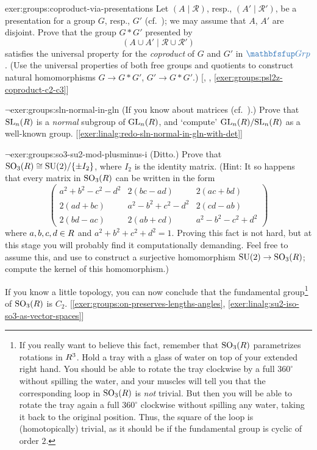 \begin{exer}{\exerused}{exer:groups:coproduct-via-presentations}
  Let $(A \mid \mathscr{R})$, resp., $(A' \mid \mathscr{R}')$, be a
  presentation for a group $G$, resp., $G'$ (cf.\
  ); we may assume that $A$, $A'$
  are disjoint. Prove that the group $G * G'$ presented by
  \[
    (A \cup A' \mid \mathscr{R} \cup \mathscr{R}')
  \]
  satisfies the universal property for the \emph{coproduct} of $G$ and
  $G'$ in $\categ{Grp}$. (Use the universal properties of both free
  groups and quotients to construct natural homomorphisms
  $G \to G * G'$, $G' \to G * G'$.)
  [,
  ,
  \ref{exer:groups:psl2z-coproduct-c2-c3}]
\end{exer}
\begin{exer}{$\lnot$}{exer:groups:sln-normal-in-gln}
  (If you know about matrices (cf.\
  ).) Prove that
  $\mathrm{SL}_n(R)$ is a \emph{normal} subgroup of
  $\mathrm{GL}_n(R)$, and `compute'
  $\mathrm{GL}_n(R)/\mathrm{SL}_n(R)$ as a well-known
  group. [\ref{exer:linalg:redo-sln-normal-in-gln-with-det}]
\end{exer}
\begin{exer}{$\lnot$}{exer:groups:so3-su2-mod-plusminus-i}
  (Ditto.) Prove that
  $\mathrm{SO}_3(R) \cong \mathrm{SU}(2)/\{\pm I_2\}$, where $I_2$ is
  the identity matrix. (Hint: It so happens that every matrix in
  $\mathrm{SO}_3(R)$ can be written in the form
  \[
    \begin{pmatrix}
      a^2+b^2-c^2-d^2 & 2(bc-ad) & 2(ac+bd) \\
      2(ad+bc) & a^2-b^2+c^2-d^2 & 2(cd-ab) \\
      2(bd-ac) & 2(ab+cd) & a^2-b^2-c^2+d^2
    \end{pmatrix}
  \]
  where $a,b,c,d \in R$ and $a^2+b^2+c^2+d^2=1$. Proving this fact is
  not hard, but at this stage you will probably find it
  computationally demanding. Feel free to assume this, and use
  \Cref{exer:groups:su2-sphere} to construct a surjective homomorphism
  $\mathrm{SU}(2) \to \mathrm{SO}_3(R)$; compute the kernel of this
  homomorphism.)

  If you know a little topology, you can now conclude that the
  fundamental group\footnote{If you really want to believe this fact,
    remember that $\mathrm{SO}_3(R)$ parametrizes rotations in
    $R^3$. Hold a tray with a glass of water on top of your extended
    right hand. You should be able to rotate the tray clockwise by a
    full $360^\circ$ without spilling the water, and your muscles will
    tell you that the corresponding loop in $\mathrm{SO}_3(R)$ is
    \emph{not} trivial. But then you will be able to rotate the tray
    again a full $360^\circ$ clockwise without spilling any water,
    taking it back to the original position. Thus, the square of the
    loop is (homotopically) trivial, as it should be if the
    fundamental group is cyclic of order $2$.} of $\mathrm{SO}_3(R)$
  is $C_2$. [\ref{exer:groups:on-preserves-lengths-angles},
  \ref{exer:linalg:su2-iso-so3-as-vector-spaces}]
\end{exer}
